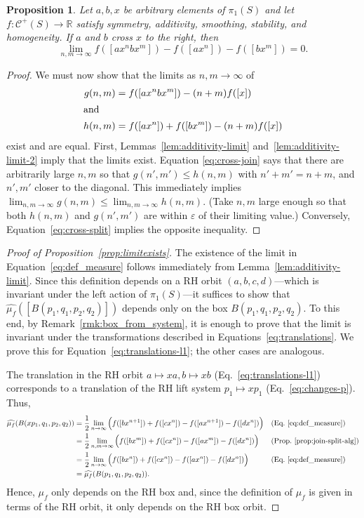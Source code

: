 \documentclass[11pt]{amsart}
\numberwithin{equation}{section}
\numberwithin{figure}{section}
\newtheorem{proposition}[theorem]{Proposition}
\theoremstyle{definition}
\theoremstyle{plain}
\newcommand\bbR{\ensuremath{\mathbb{R}}}
\newcommand*{\wh}[1]{\widehat{#1}}
\renewcommand{\epsilon}{\varepsilon}
\newcommand{\Curves}{\mathcal{C}}
\begin{document}
\begin{proposition}\label{prop:join-split-alg}
Let $a,b,x$ be arbitrary elements of $\pi_1(S)$ and
  let $f \colon \Curves^+(S) \to \bbR$ satisfy symmetry, additivity, smoothing,
  stability, and homogeneity.
  If $a$ and $b$ cross $x$ to the right, then
  \[
    \lim_{n,m\to\infty} f([a x^n b x^m]) - f([ax^n]) - f([bx^m]) = 0.
  \]
\end{proposition}
\begin{proof}
  We must now show that the limits as $n,m \to \infty$ of
  \begin{align*}
    g(n,m) &= f([ax^nbx^m]) - (n+m)f([x])\\
    \shortintertext{and}
    h(n,m) &= f([ax^n]) + f([bx^m]) - (n+m)f([x])
  \end{align*}
  exist and are equal.
  First, Lemmas~\ref{lem:additivity-limit}
  and~\ref{lem:additivity-limit-2} imply that the limits
  exist. 
  Equation \eqref{eq:cross-join} says that there are arbitrarily large
  $n,m$ so that $g(n',m') \le h(n,m)$ with $n'+m' = n+m$, and $n',m'$
  closer to the diagonal. This immediately implies
  $\lim_{n,m \to\infty} g(n,m) \le \lim_{n,m\to\infty} h(n,m)$.
  (Take
  $n,m$ large enough so that both $h(n,m)$ and $g(n',m')$ are within
  $\epsilon$ of their limiting value.) Conversely,
  Equation~\eqref{eq:cross-split} implies the opposite inequality.
\end{proof}

\begin{proof}[Proof of Proposition~\ref{prop:limitexists}]
The existence of the limit in Equation~\eqref{eq:def_measure} follows immediately from Lemma~\ref{lem:additivity-limit}.
Since this definition depends on a RH orbit $(a,b,c,d)$---which is invariant under the left action of $\pi_1(S)$---it suffices to show that $\wh{\mu_f}([B(p_1,q_1,p_2,q_2)])$ depends only on the box $B(p_1,q_1,p_2,q_2)$.
To this end, by Remark~\ref{rmk:box_from_system}, it is enough to prove that the limit is invariant under the transformations described in Equations~\eqref{eq:translations}.
We prove this for Equation~\eqref{eq:translations-l1}; the other cases are analogous.

The translation in the RH orbit $a \mapsto xa, b \mapsto xb$ (Eq.~\eqref{eq:translations-l1}) corresponds to a translation of the RH lift system $p_1 \mapsto xp_1$ (Eq.~\eqref{eq:changes-p}). Thus,
\begin{align*}
\wh{\mu_f}(B(xp_1,q_1,p_2,q_2))
&= \frac{1}{2}\lim_{n \to \infty}
\Big( f([bx^{n+1}]) + f([cx^n]) - f([ax^{n+1}]) - f([dx^n]) \Big)
&& \text{(Eq.~\eqref{eq:def_measure})} \\
&= \frac{1}{2}\lim_{n,m \to \infty}
\Big( f([bx^{m}]) + f([cx^n]) - f([ax^{m}]) - f([dx^n]) \Big)
&& \text{(Prop.~\ref{prop:join-split-alg})} \\
&= \frac{1}{2}\lim_{n \to \infty}
\Big( f([bx^{n}]) + f([cx^n]) - f([ax^{n}]) - f([dx^n]) \Big)
&& \text{(Eq.~\eqref{eq:def_measure})} \\
&= \wh{\mu_f}(B(p_1,q_1,p_2,q_2)).
\end{align*}
Hence, $\mu_f$ only depends on the RH box and, since the definition of $\mu_f$ is given in terms of the RH orbit, it only depends on the RH box orbit.
\end{proof}
\end{document}

